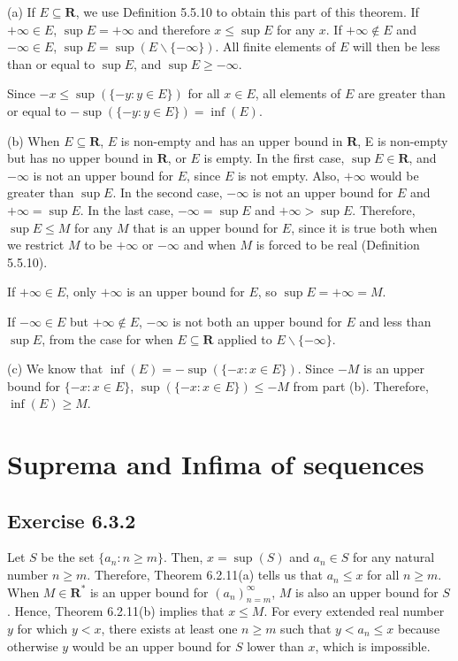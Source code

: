 \documentclass[12pt, oneside]{book}
\begin{document}
	\noindent (a) If $E \subseteq \mathbf{R}$, we use Definition 5.5.10 to obtain this part of this theorem. If $+\infty \in E$, $\sup E = +\infty$ and therefore $x \le \sup E$ for any $x$. If $+\infty \notin E$ and $-\infty \in E$, $\sup E = \sup(E \backslash \{-\infty\})$. All finite elements of $E$ will then be less than or equal to $\sup E$, and $\sup E \ge -\infty$.

	Since $-x \le \sup(\{-y: y \in E\})$ for all $x \in E$, all elements of $E$ are greater than or equal to $-\sup(\{-y: y \in E\}) = \inf(E)$.

	\bigskip
	\noindent (b) When $E \subseteq \mathbf{R}$, $E$ is non-empty and has an upper bound in $\mathbf{R}$, E is non-empty but has no upper bound in $\mathbf{R}$, or $E$ is empty. In the first case, $\sup E \in \mathbf{R}$, and $-\infty$ is not an upper bound for $E$, since $E$ is not empty.
	Also, $+\infty$ would be greater than $\sup E$. In the second case, $-\infty$ is not an upper bound for $E$ and $+\infty = \sup E$. In the last case, $-\infty = \sup E$ and $+\infty > \sup E$. Therefore, $\sup E \le M$ for any $M$ that is an upper bound for $E$, since it is true both when we restrict $M$ to be $+\infty$ or $-\infty$ and when $M$ is forced to be real (Definition 5.5.10).

	If $+\infty \in E$, only $+\infty$ is an upper bound for $E$, so $\sup E = +\infty = M$.

	If $-\infty \in E$ but $+\infty \notin E$, $-\infty$ is not both an upper bound for $E$ and less than $\sup E$, from the case for when $E \subseteq \mathbf{R}$ applied to $E \backslash \{-\infty\}$.

	(c) We know that $\inf(E) = -\sup(\{-x: x \in E\})$. Since $-M$ is an upper bound for $\{-x: x \in E\}$, $\sup(\{-x: x \in E\}) \le -M$ from part (b). Therefore, $\inf(E) \ge M$.

	\section{Suprema and Infima of sequences}

	\subsection*{Exercise 6.3.2}

	Let $S$ be the set $\{a_n: n \ge m\}$. Then, $x = \sup(S)$ and $a_n \in S$ for any natural number $n \ge m$. Therefore, Theorem 6.2.11(a) tells us that $a_n \le x$ for all $n \ge m$. When $M \in \mathbf{R}^*$ is an upper bound for $(a_n)_{n = m}^\infty$, $M$ is also an upper bound for $S$. Hence, Theorem 6.2.11(b) implies that $x \le M$. For every extended real number $y$ for which $y < x$, there exists at least one $n \ge m$ such that $y < a_n \le x$ because otherwise $y$ would be an upper bound for $S$ lower than $x$, which is impossible.
\end{document}
